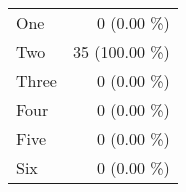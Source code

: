 \begin{tabular}{ l  r }
One & 0 (0.00 \%)\\
Two & 35 (100.00 \%)\\
Three & 0 (0.00 \%)\\
Four & 0 (0.00 \%)\\
Five & 0 (0.00 \%)\\
Six & 0 (0.00 \%)\\
\end{tabular}